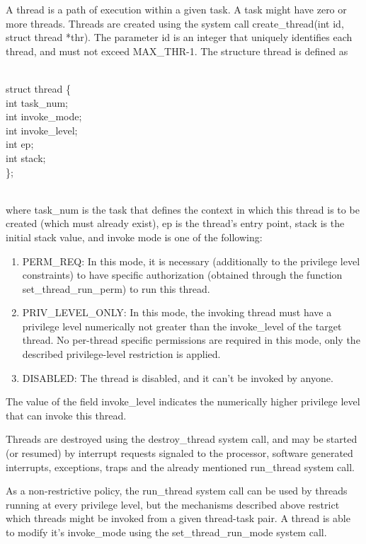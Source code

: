 \documentclass[12pt, letterpaper, oneside, english]{article}
\begin{document}
A thread is a path of execution within a given task. A task might have zero or more threads. Threads are created using the system call \textsf{create\_thread(int id, struct thread *thr)}. The parameter \textsf{id} is an integer that uniquely identifies each thread, and must not exceed \textsf{MAX\_THR}-1. The structure \textsf{thread} is defined as \\
\\
\begin{sf} \noindent struct thread \{ \\
\indent  int task\_num; \\
\indent  int invoke\_mode; \\
\indent  int invoke\_level; \\
\indent  int ep; \\
\indent  int stack; \\
\}; \\
\end{sf}
\\
where \textsf{task\_num} is the task that defines the context in which this thread is to be created (which must already exist), \textsf{ep} is the thread's entry point, \textsf{stack} is the initial stack value, and invoke mode is one of the following:
\begin{enumerate}
\item[] \textsf{PERM\_REQ}: In this mode, it is necessary (additionally to the privilege level constraints) to have specific authorization (obtained through the function \textsf{set\_thread\_run\_perm}) to run this thread.
\item[] \textsf{PRIV\_LEVEL\_ONLY}: In this mode, the invoking thread must have a privilege level numerically not greater than the \textsf{invoke\_level} of the target thread. No per-thread specific permissions are required in this mode, only the described privilege-level restriction is applied.
\item[] \textsf{DISABLED}: The thread is disabled, and it can't be invoked by anyone.
\end{enumerate}
The value of the field \textsf{invoke\_level} indicates the numerically higher privilege level that can invoke this thread. 

Threads are destroyed using the \textsf{destroy\_thread} system call, and may be started (or resumed) by interrupt requests signaled to the processor, software generated interrupts, exceptions, traps and the already mentioned \textsf{run\_thread} system call.

As a non-restrictive policy, the \textsf{run\_thread} system call can be used by threads running at every privilege level, but the mechanisms described above restrict which threads might be invoked from a given thread-task pair. A thread is able to modify it's \textsf{invoke\_mode} using the \textsf{set\_thread\_run\_mode} system call.
       
\end{document}
